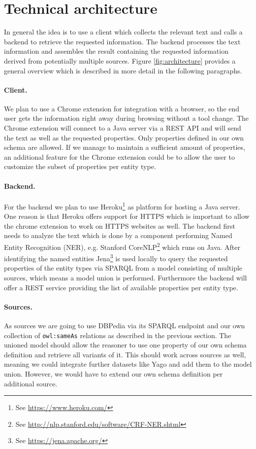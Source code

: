 \documentclass[11pt,titlepage,oneside,openany]{article}
\begin{document}
\section{Technical architecture}
In general the idea is to use a client which collects the relevant text and
calls a backend to retrieve the requested information. The backend processes the
text information and assembles the result containing the requested information
derived from potentially multiple sources. Figure \ref{fig:architecture}
provides a general overview which is described in more detail in the following
paragraphs.

\paragraph{Client.}
We plan to use a Chrome extension for integration with a browser, so the
end user gets the information right away during browsing without a tool change.
The Chrome extension will connect to a Java server via a REST API and will send
the text as well as the requested properties. Only properties defined in our own
schema are allowed. If we manage to maintain a sufficient amount of properties,
an additional feature for the Chrome extension could be to allow the user to
customize the subset of properties per entity type.

\paragraph{Backend.}
For the backend we plan to use Heroku\footnote{See
\url{https://www.heroku.com/}} as platform for hosting a Java server. One reason
is that Heroku offers support for HTTPS which is important to allow the chrome
extension to work on HTTPS websites as well. 
The backend first needs to analyze the text which is done by a component
performing Named Entity Recognition (NER), e.g. Stanford CoreNLP\footnote{See
\url{http://nlp.stanford.edu/software/CRF-NER.shtml}} which runs on Java. After
identifying the named entities Jena\footnote{See \url{https://jena.apache.org/}}
is used locally to query the requested properties of the entity types via SPARQL
from a model consisting of multiple sources, which means a model union is
performed.
Furthermore the backend will offer a REST service providing the list of
available properties per entity type.

\paragraph{Sources.}
As sources we are going to use DBPedia via its SPARQL endpoint and our own
collection of \texttt{owl:sameAs} relations as described in the previous
section. The unioned model should allow the reasoner to use one property of
our own schema definition and retrieve all variants of it. This should work
across sources as well, meaning we could integrate further datasets like Yago
and add them to the model union. However, we would have to extend our own schema
definition per additional source. 
\end{document}
